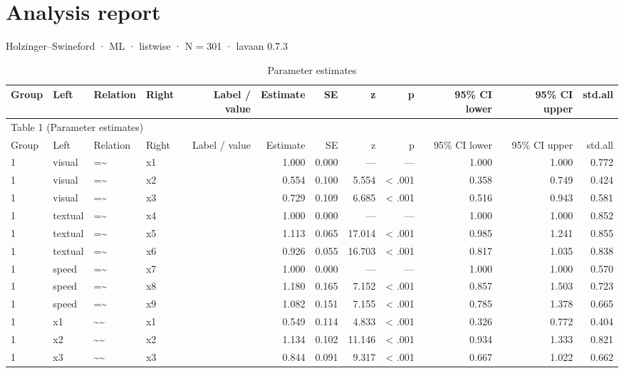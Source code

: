 \documentclass[11pt]{article}
\begin{document}
\section*{Analysis report}
Holzinger–Swineford · ML · listwise · N = 301 · lavaan 0.7.3\par

\begin{landscape}
\small
\begin{longtable}{llllrrrrrrrr}
\caption{Parameter estimates}\\
\toprule
Group & Left & Relation & Right & Label / value & Estimate & SE & z & p & 95\% CI lower & 95\% CI upper & std.all \\
\midrule
\endfirsthead
\multicolumn{12}{l}{Table 1 (Parameter estimates)} \\
\toprule
Group & Left & Relation & Right & Label / value & Estimate & SE & z & p & 95\% CI lower & 95\% CI upper & std.all \\
\midrule
\endhead
1 & visual & =\textasciitilde{} & x1 &  & 1.000 & 0.000 & — & — & 1.000 & 1.000 & 0.772 \\
1 & visual & =\textasciitilde{} & x2 &  & 0.554 & 0.100 & 5.554 & < .001 & 0.358 & 0.749 & 0.424 \\
1 & visual & =\textasciitilde{} & x3 &  & 0.729 & 0.109 & 6.685 & < .001 & 0.516 & 0.943 & 0.581 \\
1 & textual & =\textasciitilde{} & x4 &  & 1.000 & 0.000 & — & — & 1.000 & 1.000 & 0.852 \\
1 & textual & =\textasciitilde{} & x5 &  & 1.113 & 0.065 & 17.014 & < .001 & 0.985 & 1.241 & 0.855 \\
1 & textual & =\textasciitilde{} & x6 &  & 0.926 & 0.055 & 16.703 & < .001 & 0.817 & 1.035 & 0.838 \\
1 & speed & =\textasciitilde{} & x7 &  & 1.000 & 0.000 & — & — & 1.000 & 1.000 & 0.570 \\
1 & speed & =\textasciitilde{} & x8 &  & 1.180 & 0.165 & 7.152 & < .001 & 0.857 & 1.503 & 0.723 \\
1 & speed & =\textasciitilde{} & x9 &  & 1.082 & 0.151 & 7.155 & < .001 & 0.785 & 1.378 & 0.665 \\
1 & x1 & \textasciitilde{}\textasciitilde{} & x1 &  & 0.549 & 0.114 & 4.833 & < .001 & 0.326 & 0.772 & 0.404 \\
1 & x2 & \textasciitilde{}\textasciitilde{} & x2 &  & 1.134 & 0.102 & 11.146 & < .001 & 0.934 & 1.333 & 0.821 \\
1 & x3 & \textasciitilde{}\textasciitilde{} & x3 &  & 0.844 & 0.091 & 9.317 & < .001 & 0.667 & 1.022 & 0.662 \\

\end{longtable}
\end{landscape}
\end{document}
